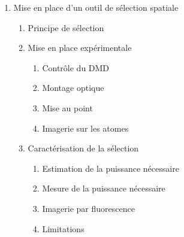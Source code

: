 \documentclass[8pt, landscape]{report}
\begin{document}
\begin{multicols}{3}
\begin{enumerate}
    \item Mise en place d’un outil de sélection spatiale
    \begin{enumerate}
        \item Principe de sélection
        \item Mise en place expérimentale
        \begin{enumerate}
            \item Contrôle du DMD
            \item Montage optique
            \item Mise au point
            \item Imagerie sur les atomes
        \end{enumerate}
        \item Caractérisation de la sélection
        \begin{enumerate}
            \item Estimation de la puissance nécessaire
            \item Mesure de la puissance nécessaire
            \item Imagerie par fluorescence
            \item Limitations
        \end{enumerate}
    \end{enumerate}


\end{enumerate}
\end{multicols}
\end{document}
